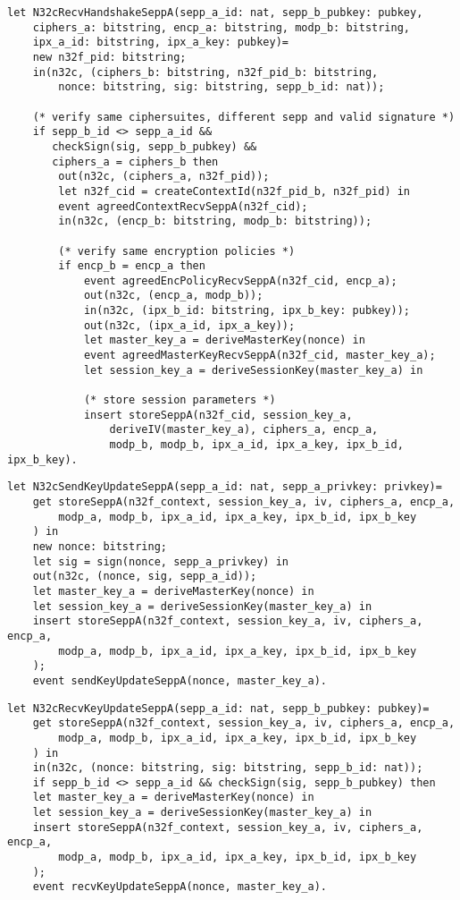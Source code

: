 \begin{lstlisting}
let N32cRecvHandshakeSeppA(sepp_a_id: nat, sepp_b_pubkey: pubkey,
    ciphers_a: bitstring, encp_a: bitstring, modp_b: bitstring,
    ipx_a_id: bitstring, ipx_a_key: pubkey)=
    new n32f_pid: bitstring;
    in(n32c, (ciphers_b: bitstring, n32f_pid_b: bitstring,
        nonce: bitstring, sig: bitstring, sepp_b_id: nat));

    (* verify same ciphersuites, different sepp and valid signature *)
    if sepp_b_id <> sepp_a_id &&
       checkSign(sig, sepp_b_pubkey) &&
       ciphers_a = ciphers_b then
        out(n32c, (ciphers_a, n32f_pid));
        let n32f_cid = createContextId(n32f_pid_b, n32f_pid) in
        event agreedContextRecvSeppA(n32f_cid);
        in(n32c, (encp_b: bitstring, modp_b: bitstring));

        (* verify same encryption policies *)
        if encp_b = encp_a then
            event agreedEncPolicyRecvSeppA(n32f_cid, encp_a);
            out(n32c, (encp_a, modp_b));
            in(n32c, (ipx_b_id: bitstring, ipx_b_key: pubkey));
            out(n32c, (ipx_a_id, ipx_a_key));
            let master_key_a = deriveMasterKey(nonce) in
            event agreedMasterKeyRecvSeppA(n32f_cid, master_key_a);
            let session_key_a = deriveSessionKey(master_key_a) in

            (* store session parameters *)
            insert storeSeppA(n32f_cid, session_key_a,
                deriveIV(master_key_a), ciphers_a, encp_a,
                modp_b, modp_b, ipx_a_id, ipx_a_key, ipx_b_id, ipx_b_key).
\end{lstlisting}

\begin{lstlisting}
let N32cSendKeyUpdateSeppA(sepp_a_id: nat, sepp_a_privkey: privkey)=
    get storeSeppA(n32f_context, session_key_a, iv, ciphers_a, encp_a,
        modp_a, modp_b, ipx_a_id, ipx_a_key, ipx_b_id, ipx_b_key
    ) in
    new nonce: bitstring;
    let sig = sign(nonce, sepp_a_privkey) in
    out(n32c, (nonce, sig, sepp_a_id));
    let master_key_a = deriveMasterKey(nonce) in
    let session_key_a = deriveSessionKey(master_key_a) in
    insert storeSeppA(n32f_context, session_key_a, iv, ciphers_a, encp_a,
        modp_a, modp_b, ipx_a_id, ipx_a_key, ipx_b_id, ipx_b_key
    );
    event sendKeyUpdateSeppA(nonce, master_key_a).
\end{lstlisting}

\begin{lstlisting}
let N32cRecvKeyUpdateSeppA(sepp_a_id: nat, sepp_b_pubkey: pubkey)=
    get storeSeppA(n32f_context, session_key_a, iv, ciphers_a, encp_a,
        modp_a, modp_b, ipx_a_id, ipx_a_key, ipx_b_id, ipx_b_key
    ) in
    in(n32c, (nonce: bitstring, sig: bitstring, sepp_b_id: nat));
    if sepp_b_id <> sepp_a_id && checkSign(sig, sepp_b_pubkey) then
    let master_key_a = deriveMasterKey(nonce) in
    let session_key_a = deriveSessionKey(master_key_a) in
    insert storeSeppA(n32f_context, session_key_a, iv, ciphers_a, encp_a,
        modp_a, modp_b, ipx_a_id, ipx_a_key, ipx_b_id, ipx_b_key
    );
    event recvKeyUpdateSeppA(nonce, master_key_a).
\end{lstlisting}


